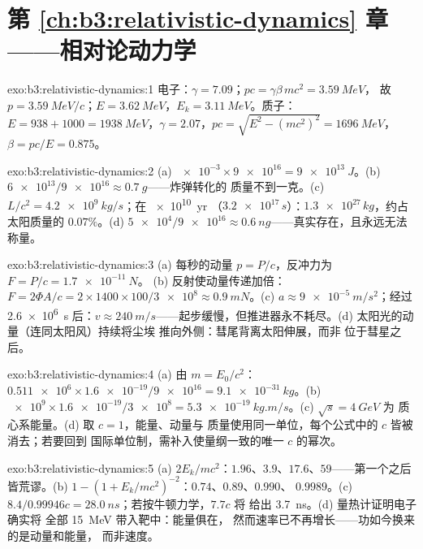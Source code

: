 \section*{第 \ref{ch:b3:relativistic-dynamics} 章——相对论动力学}

\begin{solution}{exo:b3:relativistic-dynamics:1}
电子：$\gamma = 7.09$；$pc = \gamma\beta\,mc^2 = \qty{3.59}{MeV}$，
故 $p = \qty{3.59}{MeV}/c$；$E = \qty{3.62}{MeV}$，$E_k =
\qty{3.11}{MeV}$。质子：$E = 938 + 1000 = \qty{1938}{MeV}$，$\gamma
= 2.07$，$pc = \sqrt{E^2 - (mc^2)^2} = \qty{1696}{MeV}$，$\beta =
pc/E = 0.875$。
\end{solution}

\begin{solution}{exo:b3:relativistic-dynamics:2}
(a) $\num{e-3} \times \num{9e16} = \qty{9e13}{J}$。(b) $\num{6e13}/
\num{9e16} \approx \qty{0.7}{g}$——炸弹转化的
质量不到一克。(c) $L/c^2 = \qty{4.2e9}{kg/s}$；在 \qty{e10}{yr}
（$\num{3.2e17}{}\,\unit{s}$）：$\num{1.3e27}{}\,\unit{kg}$，约占
太阳质量的 $0.07\%$。(d) $\num{5e4}/\num{9e16} \approx
\qty{0.6}{ng}$——真实存在，且永远无法称量。
\end{solution}

\begin{solution}{exo:b3:relativistic-dynamics:3}
(a) 每秒的动量 $p = P/c$，反冲力为 $F = P/c = \qty{1.7e-11}{N}$。
(b) 反射使动量传递加倍：$F = 2\Phi A/c =
2 \times 1400 \times 100/\num{3e8} \approx \qty{0.9}{mN}$。(c) $a
\approx \qty{9e-5}{m/s^2}$；经过 \qty{2.6e6}{s} 后：$v \approx
\qty{240}{m/s}$——起步缓慢，但推进器永不耗尽。(d)
太阳光的动量（连同太阳风）持续将尘埃
推向外侧：彗尾背离太阳伸展，而非
位于彗星之后。
\end{solution}

\begin{solution}{exo:b3:relativistic-dynamics:4}
(a) 由 $m = E_0/c^2$：$\num{0.511e6} \times \num{1.6e-19}/\num{9e16} =
\qty{9.1e-31}{kg}$。(b) $\num{e9} \times \num{1.6e-19}/\num{3e8} =
\qty{5.3e-19}{kg.m/s}$。(c) $\sqrt s = \qty{4}{GeV}$ 为
质心系能量。(d) 取 $c = 1$，能量、动量与
质量使用同一单位，每个公式中的 $c$ 皆被消去；若要回到
国际单位制，需补入使量纲一致的唯一 $c$ 的幂次。
\end{solution}

\begin{solution}{exo:b3:relativistic-dynamics:5}
(a) $2E_k/mc^2$：$1.96$、$3.9$、$17.6$、$59$——第一个之后
皆荒谬。(b) $1 - (1 + E_k/mc^2)^{-2}$：$0.74$、$0.89$、$0.990$、
$0.9989$。(c) $8.4/0.99946c = \qty{28.0}{ns}$；若按牛顿力学，$7.7c$ 将
给出 \qty{3.7}{ns}。(d) 量热计证明电子确实将
全部 \qty{15}{MeV} 带入靶中：能量俱在，
然而速率已不再增长——功如今换来的是动量和能量，
而非速度。
\end{solution}

